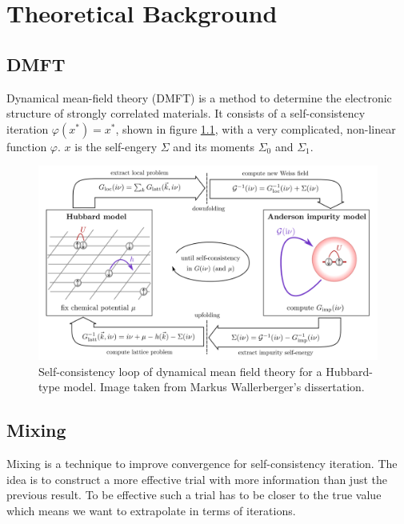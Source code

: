 \chapter{Theoretical Background}
\label{ch:background}

\section{DMFT}

Dynamical mean-field theory (DMFT)\cite{dmft} is a method to determine the electronic structure of strongly correlated materials. It consists of a self-consistency iteration \(\varphi(x^\ast) = x^\ast\), shown in figure \ref{fig:dmft}, with a very complicated, non-linear function \(\varphi\). $x$ is the self-engery $\Sigma$ and its moments $\Sigma_0$ and $\Sigma_1$.

\begin{figure}[H]
    \centering
    \includegraphics[width=1.0\textwidth]{figures/dmft.png}
    \caption{Self-consistency loop of dynamical mean field theory for a Hubbard-type model. Image taken from Markus Wallerberger's dissertation.\cite{wallerberger2016}}
    \label{fig:dmft}
\end{figure}

\section{Mixing}
Mixing is a technique to improve convergence for self-consistency iteration. The idea is to construct a more effective trial with more information than just the previous result. To be effective such a trial has to be closer to the true value which means we want to extrapolate in terms of iterations.

